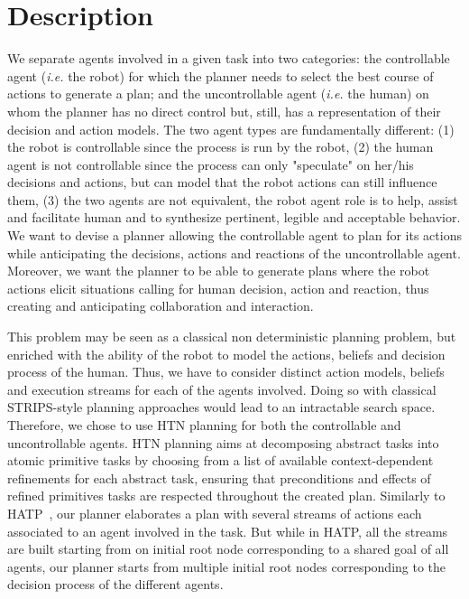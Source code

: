 \documentclass[a4paper,11pt,twoside]{StyleThese}
\begin{document}
\section{Description}
We separate agents involved in a given task into two categories: the controllable agent (\textit{i.e.} the robot) for which the planner needs to select the best course of actions to generate a plan; and the uncontrollable agent (\textit{i.e.} the human) on whom the planner has no direct control but, still, has a representation of their decision and action models. The two agent types are fundamentally different: (1) the robot is controllable since the process is run by the robot, (2) the human agent is not controllable since the process can only "speculate" on her/his decisions and actions, but can model that the robot actions can still influence them, (3) the two agents are not equivalent, the robot agent role is to help, assist and facilitate human and to synthesize pertinent, legible and acceptable behavior.
We want to devise a planner allowing the controllable agent to plan for its actions while anticipating the decisions, actions and reactions of the uncontrollable agent. Moreover, we want the planner to be able to generate plans where the robot actions elicit situations calling for human decision, action and reaction, thus creating and anticipating collaboration and interaction.

This problem may be seen as a classical non deterministic planning problem, but enriched with the ability of the robot to model the actions, beliefs and decision process of the human. Thus, we have to consider distinct action models, beliefs and execution streams for each of the agents involved. Doing so with classical STRIPS-style planning approaches would lead to an intractable search space. Therefore, we chose to use HTN planning for both the controllable and uncontrollable agents. HTN planning aims at decomposing abstract tasks into atomic primitive tasks by choosing from a list of available context-dependent refinements for each abstract task, ensuring that preconditions and effects of refined primitives tasks are respected throughout the created plan. Similarly to HATP~\cite{sebastiani2017dealing}, our planner elaborates a plan with several streams of actions each associated to an agent involved in the task. But while in HATP, all the streams are built starting from on initial root node corresponding to a shared goal of all agents, our planner starts from multiple initial root nodes corresponding to the decision process of the different agents.
\end{document}
